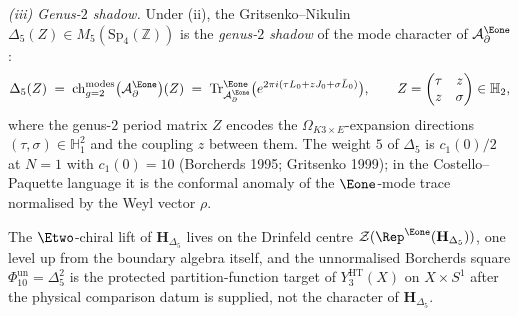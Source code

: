 \begin{proposition}
\emph{(iii) Genus-$2$ shadow.} Under (ii), the Gritsenko--Nikulin
$\Delta_5(Z)\in M_5(\mathrm{Sp}_4(\mathbb Z))$ is the
\emph{genus-$2$ shadow} of the mode character of
$\mathcal A^{\Eone}_\partial$:
\[
 \Delta_5(Z)
 \;=\;
 \mathrm{ch}^{\mathrm{modes}}_{g=2}\bigl(\mathcal A^{\Eone}_\partial\bigr)(Z)
 \;=\;
 \mathrm{Tr}^{\Eone}_{\mathcal A^{\Eone}_\partial}
 \bigl(e^{2\pi i(\tau L_0 + z J_0 + \sigma \bar L_0)}\bigr),
 \qquad
 Z=\begin{pmatrix}\tau & z\\ z & \sigma\end{pmatrix}\in\mathbb H_2,
\]
where the genus-$2$ period matrix $Z$ encodes the
$\Omega_{K3\times E}$-expansion directions $(\tau,\sigma)\in\mathbb H_1^2$
and the coupling $z$ between them. The weight $5$ of $\Delta_5$ is
$c_1(0)/2$ at $N=1$ with $c_1(0)=10$ (Borcherds 1995; Gritsenko 1999);
in the Costello--Paquette language it is the conformal anomaly of
the $\Eone$-mode trace normalised by the Weyl vector $\rho$.

The $\Etwo$-chiral lift of $\mathbf H_{\Delta_5}$ lives on the Drinfeld
centre $\mathcal Z(\Rep^{\Eone}(\mathbf H_{\Delta_5}))$, one level up
from the boundary algebra itself, and the unnormalised Borcherds square
$\Phi_{10}^{\mathrm{un}}=\Delta_5^2$ is the protected partition-function target of
$Y^{\mathrm{HT}}_3(X)$ on $X\times S^1$ after the physical comparison
datum is supplied, not the character of
$\mathbf H_{\Delta_5}$.
\end{proposition}

